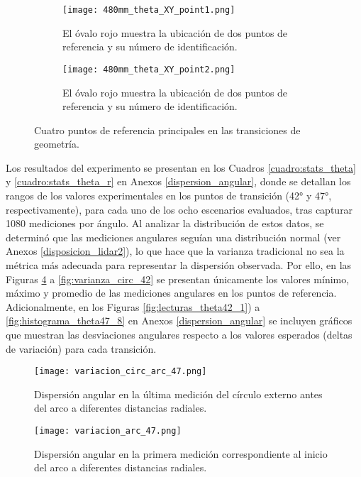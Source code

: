 \begin{figure}[H]
	\centering
	\begin{subfigure}{0.8\textwidth}
		\centering
		\texttt{[image: 480mm\_theta\_XY\_point1.png]}
		\caption{El óvalo rojo muestra la ubicación de dos puntos de referencia y su número de identificación.}
		\label{fig:point1}
		\vspace{1em}
	\end{subfigure}
	\begin{subfigure}{0.8\textwidth}
		\centering
		\texttt{[image: 480mm\_theta\_XY\_point2.png]}
		\caption{El óvalo rojo muestra la ubicación de dos puntos de referencia y su número de identificación.}
		\label{fig:point2}
	\end{subfigure}
	\caption{Cuatro puntos de referencia principales en las transiciones de geometría.}
	\label{fig:points}
\end{figure}


Los resultados del experimento se presentan en los Cuadros \ref{cuadro:stats_theta} y \ref{cuadro:stats_theta_r} en Anexos \ref{dispersion_angular}, donde se detallan los rangos de los valores experimentales en los puntos de transición (42° y 47°, respectivamente), para cada uno de los ocho escenarios evaluados, tras capturar 1080 mediciones por ángulo. Al analizar la distribución de estos datos, se determinó que las mediciones angulares seguían una distribución normal (ver Anexos \ref{disposicion_lidar2}), lo que hace que la varianza tradicional no sea la métrica más adecuada para representar la dispersión observada. Por ello, en las Figuras \ref{fig:varianza_circ_47} a \ref{fig:varianza_circ_42} se presentan únicamente los valores mínimo, máximo y promedio de las mediciones angulares en los puntos de referencia. Adicionalmente, en los Figuras \ref{fig:lecturas_theta42_1}) a \ref{fig:histograma_theta47_8} en Anexos \ref{dispersion_angular} se incluyen gráficos que muestran las desviaciones angulares respecto a los valores esperados (deltas de variación) para cada transición.

\begin{figure}[H]
	\centering
	\texttt{[image: variacion\_circ\_arc\_47.png]}
	\caption{Dispersión angular en la última medición del círculo externo antes del arco a diferentes distancias radiales.}
	\label{fig:varianza_circ_47}
\end{figure}

\begin{figure}[H]
	\centering
	\texttt{[image: variacion\_arc\_47.png]}
	\caption{Dispersión angular en la primera medición correspondiente al inicio del arco a diferentes distancias radiales.}
	\label{fig:varianza_arc_47}
\end{figure}


